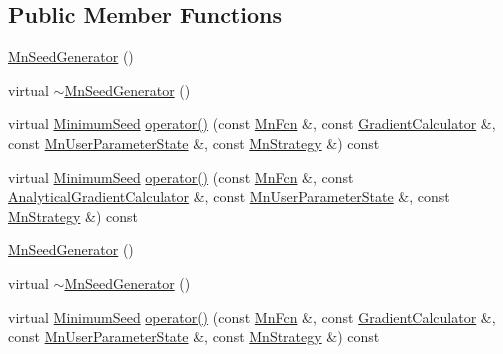 \subsection*{Public Member Functions}
\begin{DoxyCompactItemize}
\item 
\mbox{\hyperlink{classROOT_1_1Minuit2_1_1MnSeedGenerator_ad3ed7b1fc379dd74ba7af16279f77e90}{Mn\+Seed\+Generator}} ()
\item 
virtual \mbox{\hyperlink{classROOT_1_1Minuit2_1_1MnSeedGenerator_a3dee518720bebaac31b0bdd5b64c9856}{$\sim$\+Mn\+Seed\+Generator}} ()
\item 
virtual \mbox{\hyperlink{classROOT_1_1Minuit2_1_1MinimumSeed}{Minimum\+Seed}} \mbox{\hyperlink{classROOT_1_1Minuit2_1_1MnSeedGenerator_a654d0f1b67cd1a3a17de8334ba811ef0}{operator()}} (const \mbox{\hyperlink{classROOT_1_1Minuit2_1_1MnFcn}{Mn\+Fcn}} \&, const \mbox{\hyperlink{classROOT_1_1Minuit2_1_1GradientCalculator}{Gradient\+Calculator}} \&, const \mbox{\hyperlink{classROOT_1_1Minuit2_1_1MnUserParameterState}{Mn\+User\+Parameter\+State}} \&, const \mbox{\hyperlink{classROOT_1_1Minuit2_1_1MnStrategy}{Mn\+Strategy}} \&) const
\item 
virtual \mbox{\hyperlink{classROOT_1_1Minuit2_1_1MinimumSeed}{Minimum\+Seed}} \mbox{\hyperlink{classROOT_1_1Minuit2_1_1MnSeedGenerator_a300ecb8a37b30fc5bd13c353f3338a92}{operator()}} (const \mbox{\hyperlink{classROOT_1_1Minuit2_1_1MnFcn}{Mn\+Fcn}} \&, const \mbox{\hyperlink{classROOT_1_1Minuit2_1_1AnalyticalGradientCalculator}{Analytical\+Gradient\+Calculator}} \&, const \mbox{\hyperlink{classROOT_1_1Minuit2_1_1MnUserParameterState}{Mn\+User\+Parameter\+State}} \&, const \mbox{\hyperlink{classROOT_1_1Minuit2_1_1MnStrategy}{Mn\+Strategy}} \&) const
\item 
\mbox{\hyperlink{classROOT_1_1Minuit2_1_1MnSeedGenerator_ad3ed7b1fc379dd74ba7af16279f77e90}{Mn\+Seed\+Generator}} ()
\item 
virtual \mbox{\hyperlink{classROOT_1_1Minuit2_1_1MnSeedGenerator_a3dee518720bebaac31b0bdd5b64c9856}{$\sim$\+Mn\+Seed\+Generator}} ()
\item 
virtual \mbox{\hyperlink{classROOT_1_1Minuit2_1_1MinimumSeed}{Minimum\+Seed}} \mbox{\hyperlink{classROOT_1_1Minuit2_1_1MnSeedGenerator_a1c06ece239f548163beb232600dc8cc3}{operator()}} (const \mbox{\hyperlink{classROOT_1_1Minuit2_1_1MnFcn}{Mn\+Fcn}} \&, const \mbox{\hyperlink{classROOT_1_1Minuit2_1_1GradientCalculator}{Gradient\+Calculator}} \&, const \mbox{\hyperlink{classROOT_1_1Minuit2_1_1MnUserParameterState}{Mn\+User\+Parameter\+State}} \&, const \mbox{\hyperlink{classROOT_1_1Minuit2_1_1MnStrategy}{Mn\+Strategy}} \&) const

\end{DoxyCompactItemize}
